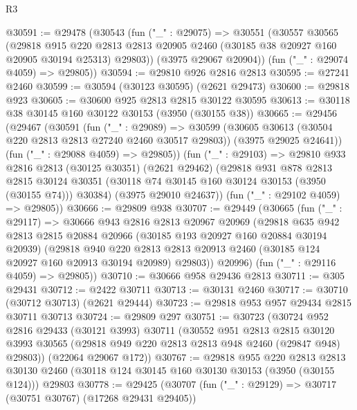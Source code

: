 \begin{lexlean}{R3}
\begin{coremodule}
@30591 := @29478
    (@30543
      (fun ("_" : @29075) =>
      @30551
        (@30557
          @30565
          (@29818
            @915
            @220
            @2813
            @2813
            @20905
            @2460
            (@30185 @38 @20927 @160 @20905 @30194 @25313)
            @29803))
        (@3975 @29067 @20904))
      (fun ("_" : @29074 @4059) => @29805))
@30594 := @29810 @926 @2816 @2813
@30595 := @27241 @2460
@30599 := @30594 (@30123 @30595) (@2621 @29473)
@30600 := @29818 @923
@30605 := @30600 @925 @2813 @2815 @30122 @30595
@30613 := @30118 @38 @30145 @160 @30122 @30153 (@3950 (@30155 @38))
@30665 := @29456
    (@29467
      (@30591
        (fun ("_" : @29089) =>
        @30599
          (@30605 @30613 (@30504 @220 @2813 @2813 @27240 @2460 @30517 @29803))
          (@3975 @29025 @24641))
        (fun ("_" : @29088 @4059) => @29805))
      (fun ("_" : @29103) =>
      @29810
        @933
        @2816
        @2813
        (@30125 @30351)
        (@2621 @29462)
        (@29818
          @931
          @878
          @2813
          @2815
          @30124
          @30351
          (@30118 @74 @30145 @160 @30124 @30153 (@3950 (@30155 @74)))
          @30384)
        (@3975 @29010 @24637))
      (fun ("_" : @29102 @4059) => @29805))
@30666 := @29809 @938
@30707 := @29449
    (@30665
      (fun ("_" : @29117) =>
      @30666
        @943
        @2816
        @2813
        @20967
        @20969
        (@29818
          @635
          @942
          @2813
          @2815
          @20884
          @20966
          (@30185 @193 @20927 @160 @20884 @30194 @20939)
          (@29818
            @940
            @220
            @2813
            @2813
            @20913
            @2460
            (@30185 @124 @20927 @160 @20913 @30194 @20989)
            @29803))
        @20996)
      (fun ("_" : @29116 @4059) => @29805))
@30710 := @30666 @958 @29436 @2813
@30711 := @305 @29431
@30712 := @2422 @30711
@30713 := @30131 @2460
@30717 := @30710 (@30712 @30713) (@2621 @29444)
@30723 := @29818 @953 @957 @29434 @2815 @30711 @30713
@30724 := @29809 @297
@30751 := @30723
    (@30724
      @952
      @2816
      @29433
      (@30121 @3993)
      @30711
      (@30552
        @951
        @2813
        @2815
        @30120
        @3993
        @30565
        (@29818 @949 @220 @2813 @2813 @948 @2460 (@29847 @948) @29803))
      (@22064 @29067 @172))
@30767 := @29818
    @955
    @220
    @2813
    @2813
    @30130
    @2460
    (@30118 @124 @30145 @160 @30130 @30153 (@3950 (@30155 @124)))
    @29803
@30778 := @29425
    (@30707
      (fun ("_" : @29129) => @30717 (@30751 @30767) (@17268 @29431 @29405))

\end{coremodule}
\end{lexlean}
